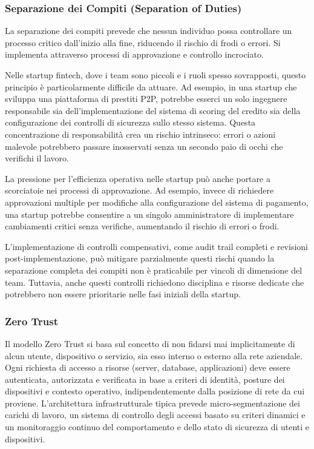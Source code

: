\documentclass[a4paper,12pt]{report}
\begin{document}
\subsubsection{Separazione dei Compiti (Separation of Duties)}

La separazione dei compiti prevede che nessun individuo possa controllare un processo critico dall'inizio alla fine, riducendo il rischio di frodi o errori. Si implementa attraverso processi di approvazione e controllo incrociato.

Nelle startup fintech, dove i team sono piccoli e i ruoli spesso sovrapposti, questo principio è particolarmente difficile da attuare. Ad esempio, in una startup che sviluppa una piattaforma di prestiti P2P, potrebbe esserci un solo ingegnere responsabile sia dell'implementazione del sistema di scoring del credito sia della configurazione dei controlli di sicurezza sullo stesso sistema. Questa concentrazione di responsabilità crea un rischio intrinseco: errori o azioni malevole potrebbero passare inosservati senza un secondo paio di occhi che verifichi il lavoro.

La pressione per l'efficienza operativa nelle startup può anche portare a scorciatoie nei processi di approvazione. Ad esempio, invece di richiedere approvazioni multiple per modifiche alla configurazione del sistema di pagamento, una startup potrebbe consentire a un singolo amministratore di implementare cambiamenti critici senza verifiche, aumentando il rischio di errori o frodi.

L'implementazione di controlli compensativi, come audit trail completi e revisioni post-implementazione, può mitigare parzialmente questi rischi quando la separazione completa dei compiti non è praticabile per vincoli di dimensione del team. Tuttavia, anche questi controlli richiedono disciplina e risorse dedicate che potrebbero non essere prioritarie nelle fasi iniziali della startup.
\subsubsection{Zero Trust}
Il modello Zero Trust si basa sul concetto di non fidarsi mai implicitamente di alcun utente, dispositivo o servizio, sia esso interno o esterno alla rete aziendale. Ogni richiesta di accesso a risorse (server, database, applicazioni) deve essere autenticata, autorizzata e verificata in base a criteri di identità, posture dei dispositivi e contesto operativo, indipendentemente dalla posizione di rete da cui proviene. L'architettura infrastrutturale tipica prevede micro-segmentazione dei carichi di lavoro, un sistema di controllo degli accessi basato su criteri dinamici e un monitoraggio continuo del comportamento e dello stato di sicurezza di utenti e dispositivi.  
\end{document}

